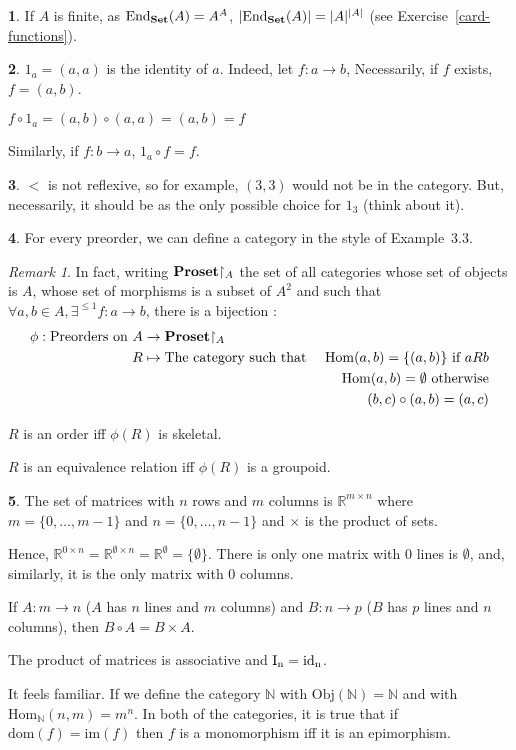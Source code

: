 \documentclass[11pt]{article}
\theoremstyle{definition}
\newtheorem{exo}{}[subsection]
\theoremstyle{remark}
\newtheorem*{rmq}{Remark}
\def\N{\mathbb{N}}
\def\R{\mathbb{R}}
\def\dom{\mathrm{dom}}
\def\im{\mathrm{im}}
\def\id{\mathrm{id}}
\def\Obj{\mathrm{Obj}}
\def\Hom{\mathrm{Hom}}
\def\End{\mathrm{End}}
\newcommand{\catname}[1]{{\normalfont\textbf{#1}}}
\newcommand{\Set}{\catname{Set}}
\begin{document}
\begin{exo}
	If $A$ is finite, as $\End_\Set(A)=A^A$, $|\End_\Set(A)|=|A|^{|A|}$ (see Exercise~\ref{card-functions}).
\end{exo}

\begin{exo}
	$1_a=(a,a)$ is the identity of $a$.
	Indeed, let $f:a\to b$, Necessarily, if $f$ exists, $f=(a,b)$.
	
	$f\circ 1_a=(a,b)\circ (a,a)=(a,b)=f$

	Similarly, if $f:b\to a$, $1_a\circ f=f$.
\end{exo}

\begin{exo}
	$<$ is not reflexive, so for example, $(3,3)$ would not be in the category. But, necessarily, it should be as the only possible choice for $1_3$ (think about it).
\end{exo}

\begin{exo}
	For every preorder, we can define a category in the style of Example~3.3.
\end{exo}

\begin{rmq}
	In fact, writing $\catname{Proset}{\restriction_A}$ the set of all categories whose set of objects is $A$, whose set of morphisms is a subset of $A^2$ and such that $\forall a,b\in A,\exists^{\leq1}f:a\to b$, there is a bijection :
	\begin{align*}\phi:\text{Preorders on }A&\to\catname{Proset}{\restriction_A}\\R&\mapsto\text{The category such that }&\Hom(a,b)=\{(a,b)\}\text{ if }aRb\\&&\Hom(a,b)=\emptyset\text{ otherwise}\\&&(b,c)\circ(a,b)=(a,c)\end{align*}

	$R$ is an order iff $\phi(R)$ is skeletal.

	$R$ is an equivalence relation iff $\phi(R)$ is a groupoid.
\end{rmq}

\begin{exo}
	The set of matrices with $n$ rows and $m$ columns is $\R^{m\times n}$ where $m=\{0,\dots,m-1\}$ and $n=\{0,\dots,n-1\}$ and $\times$ is the product of sets.

	Hence, $\R^{0\times n}=\R^{\emptyset\times n}=\R^\emptyset=\{\emptyset\}$.
	There is only one matrix with 0 lines is $\emptyset$, and, similarly, it is the only matrix with 0 columns.

	If $A:m\to n$ ($A$ has $n$ lines and $m$ columns) and $B:n\to p$ ($B$ has $p$ lines and $n$ columns), then $B\circ A=B\times A$.

	The product of matrices is associative and $\rm I_n=\id_n$.

	\bigskip

	It feels familiar.
	If we define the category $\N$ with $\Obj(\N)=\N$ and with $\Hom_\N(n,m)=m^n$.
	In both of the categories, it is true that if $\dom(f)=\im(f)$ then $f$ is a monomorphism iff it is an epimorphism.
\end{exo}
\end{document}
